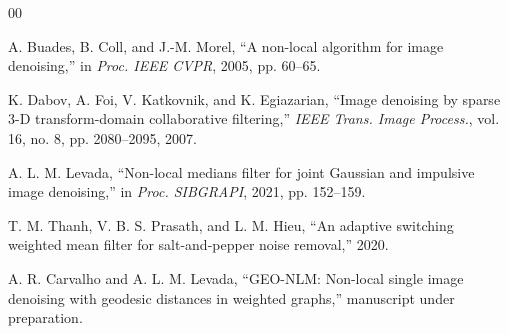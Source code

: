 \documentclass{ieeeaccess}
\begin{document}
\begin{thebibliography}{00}

A. Buades, B. Coll, and J.-M. Morel, ``A non-local algorithm for image denoising,'' in \emph{Proc. IEEE CVPR}, 2005, pp. 60--65.

K. Dabov, A. Foi, V. Katkovnik, and K. Egiazarian, ``Image denoising by sparse 3-D transform-domain collaborative filtering,'' \emph{IEEE Trans. Image Process.}, vol. 16, no. 8, pp. 2080--2095, 2007.

A. L. M. Levada, ``Non-local medians filter for joint Gaussian and impulsive image denoising,'' in \emph{Proc. SIBGRAPI}, 2021, pp. 152--159.

T. M. Thanh, V. B. S. Prasath, and L. M. Hieu, ``An adaptive switching weighted mean filter for salt-and-pepper noise removal,'' 2020.

A. R. Carvalho and A. L. M. Levada, ``GEO-NLM: Non-local single image denoising with geodesic distances in weighted graphs,'' manuscript under preparation.

\end{thebibliography}
\end{document}
